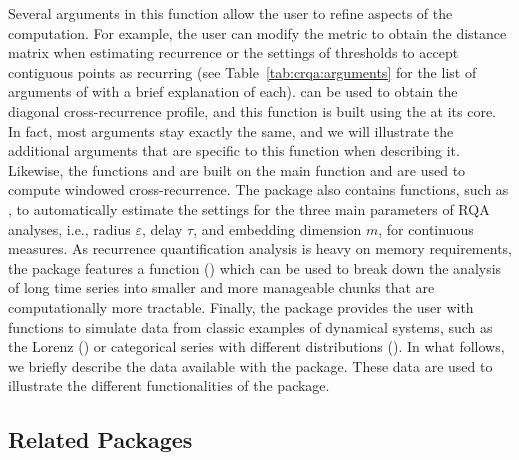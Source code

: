 Several arguments in this function allow the user to refine aspects of the computation. For example, the user can modify the metric to obtain the distance matrix when estimating recurrence or the settings of thresholds to accept contiguous points as recurring (see Table~\ref{tab:crqa:arguments} for the list of arguments of  with a brief explanation of each).  can be used to obtain the diagonal cross-recurrence profile, and this function is built using the  at its core. In fact, most arguments stay exactly the same, and we will illustrate the additional arguments that are specific to this function when describing it. Likewise, the functions  and  are built on the main function  and are used to compute windowed cross-recurrence. The package also contains functions, such as , to automatically estimate the settings for the three main parameters of RQA analyses, i.e., radius $\varepsilon$, delay $\tau$, and embedding dimension $m$, for continuous measures. As recurrence quantification analysis is heavy on memory requirements, the package features a function () which can be used to break down the analysis of long time series into smaller and more manageable chunks that are computationally more tractable. Finally, the package provides the user with functions to simulate data from classic examples of dynamical systems, such as the Lorenz () or categorical series with different distributions (). In what follows, we briefly describe the data available with the package. These data are used to illustrate the different functionalities of the  package.

\subsection{Related Packages}

